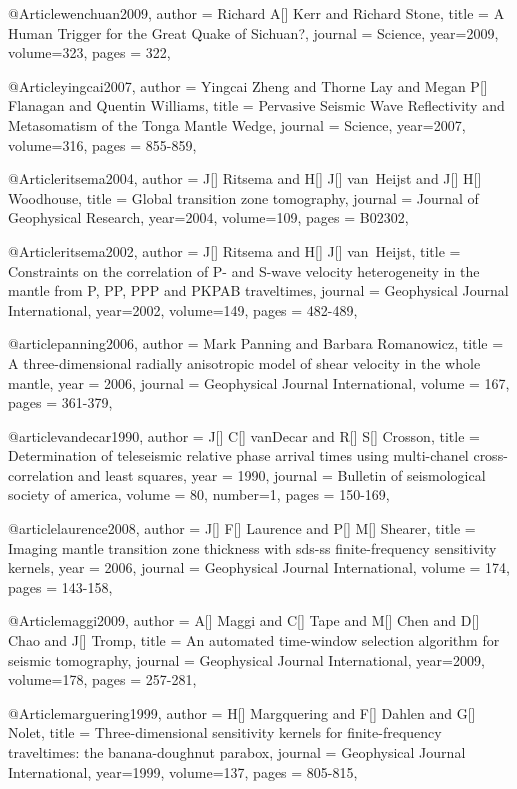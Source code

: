 @Article{wenchuan2009,
  author =	 {Richard A[] Kerr and Richard Stone},
  title =	 {A Human Trigger for the Great Quake of Sichuan?},
  journal =	 {Science},
  year=2009,
  volume=323,
  pages =	 {322},
}

@Article{yingcai2007,
  author =	 {Yingcai Zheng and Thorne Lay and Megan P[] Flanagan and Quentin Williams},
  title =	 {Pervasive Seismic Wave Reflectivity and Metasomatism of the Tonga Mantle Wedge},
  journal =	 {Science},
  year=2007,
  volume=316,
  pages =	 {855-859},
}

@Article{ritsema2004,
  author =	 {J[] Ritsema and H[] J[] van~Heijst and J[] H[] Woodhouse},
  title =	 {Global transition zone tomography},
  journal =	 {Journal of Geophysical Research},
  year=2004,
  volume=109,
  pages =	 {B02302},
}

@Article{ritsema2002,
  author =	 {J[] Ritsema and H[] J[] van~Heijst},
  title =	 {Constraints on the correlation of P- and S-wave velocity heterogeneity in the mantle from P, PP, PPP and PKPAB traveltimes},
  journal =	 {Geophysical Journal International},
  year=2002,
  volume=149,
  pages =	 {482-489},
}

@article{panning2006,
author = {Mark Panning and Barbara Romanowicz},
title = {A three-dimensional radially anisotropic model of shear velocity
in the whole mantle},
year = {2006},
journal = {Geophysical Journal International},
volume = {167},
pages = {361-379},
}

@article{vandecar1990,
author = {J[] C[] vanDecar and R[] S[] Crosson},
title = {Determination of teleseismic relative phase arrival times using multi-chanel cross-correlation and least squares},
year = {1990},
journal = {Bulletin of seismological society of america},
volume = {80},
number=1,
pages = {150-169},
}

@article{laurence2008,
author = {J[] F[] Laurence and P[] M[] Shearer},
title = {Imaging mantle transition zone thickness with sds-ss finite-frequency sensitivity kernels},
year = {2006},
journal = {Geophysical Journal International},
volume = {174},
pages = {143-158},
}



@Article{maggi2009,
  author =	 {A[] Maggi and C[] Tape and M[] Chen and D[] Chao and J[] Tromp},
  title =	 {An automated time-window selection algorithm for seismic tomography},
  journal =	 {Geophysical Journal International},
  year=2009,
  volume=178,
  pages =	 {257-281},
}

@Article{marguering1999,
  author =	 {H[] Margquering and F[] Dahlen and G[] Nolet},
  title =	 {Three-dimensional sensitivity kernels for finite-frequency traveltimes: the banana-doughnut parabox},
  journal =	 {Geophysical Journal International},
  year=1999,
  volume=137,
  pages =	 {805-815},
}

